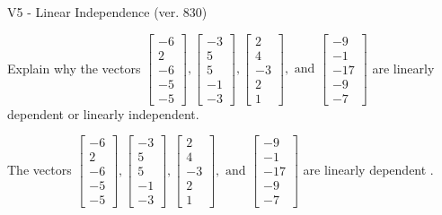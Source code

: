 \begin{exercise}
  \begin{exerciseTitle}V5 - Linear Independence (ver. 830)\end{exerciseTitle}
  \begin{exerciseStatement}
    Explain why the vectors \(\left[\begin{array}{r}
-6 \\
2 \\
-6 \\
-5 \\
-5
\end{array}\right] , \left[\begin{array}{r}
-3 \\
5 \\
5 \\
-1 \\
-3
\end{array}\right] , \left[\begin{array}{r}
2 \\
4 \\
-3 \\
2 \\
1
\end{array}\right] , \text{ and } \left[\begin{array}{r}
-9 \\
-1 \\
-17 \\
-9 \\
-7
\end{array}\right]\) are linearly dependent or linearly independent.	


  \end{exerciseStatement}
  \begin{exerciseAnswer}
   The vectors \(\left[\begin{array}{r}
-6 \\
2 \\
-6 \\
-5 \\
-5
\end{array}\right] , \left[\begin{array}{r}
-3 \\
5 \\
5 \\
-1 \\
-3
\end{array}\right] , \left[\begin{array}{r}
2 \\
4 \\
-3 \\
2 \\
1
\end{array}\right] , \text{ and } \left[\begin{array}{r}
-9 \\
-1 \\
-17 \\
-9 \\
-7
\end{array}\right]\) are 
  	 linearly dependent  .
  


  \end{exerciseAnswer}
\end{exercise}